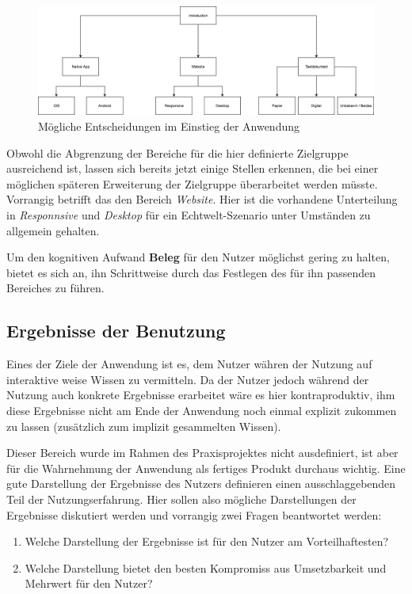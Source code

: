 \begin{figure}[h]
    \centering
    \includegraphics[width=1\textwidth]{images/ablauf_intro.png}
    \caption{Mögliche Entscheidungen im Einstieg der Anwendung}
    \label{fig:intro}
\end{figure}

Obwohl die Abgrenzung der Bereiche für die hier definierte Zielgruppe ausreichend ist, lassen sich bereits jetzt einige Stellen erkennen, die bei einer möglichen späteren Erweiterung der Zielgruppe überarbeitet werden müsste. Vorrangig betrifft das den Bereich \textit{Website}. Hier ist die vorhandene Unterteilung in \textit{Responnsive} und \textit{Desktop} für ein Echtwelt-Szenario unter Umständen zu allgemein gehalten.

Um den kognitiven Aufwand \textbf{Beleg} für den Nutzer möglichst gering zu halten, bietet es sich an, ihn Schrittweise durch das Festlegen des für ihn passenden Bereiches zu führen.

\subsection{Ergebnisse der Benutzung}
Eines der Ziele der Anwendung ist es, dem Nutzer währen der Nutzung auf interaktive weise Wissen zu vermitteln. Da der Nutzer jedoch während der Nutzung auch konkrete Ergebnisse erarbeitet wäre es hier kontraproduktiv, ihm diese Ergebnisse nicht am Ende der Anwendung noch einmal explizit zukommen zu lassen (zusätzlich zum implizit gesammelten Wissen).

Dieser Bereich wurde im Rahmen des Praxisprojektes nicht ausdefiniert, ist aber für die Wahrnehmung der Anwendung als fertiges Produkt durchaus wichtig. Eine gute Darstellung der Ergebnisse des Nutzers definieren einen ausschlaggebenden Teil der Nutzungserfahrung.
Hier sollen also mögliche Darstellungen der Ergebnisse diskutiert werden und vorrangig zwei Fragen beantwortet werden:
\begin{enumerate}
  \item Welche Darstellung der Ergebnisse ist für den Nutzer am Vorteilhaftesten?
  \item Welche Darstellung bietet den besten Kompromiss aus Umsetzbarkeit und Mehrwert für den Nutzer?
\end{enumerate}


